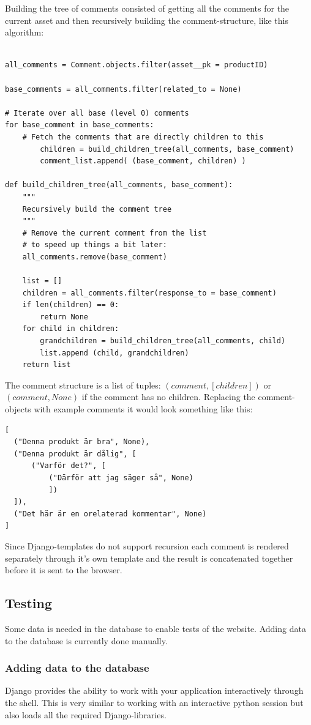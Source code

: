 \documentclass[12pt, a4paper,titlepage]{article}
\begin{document}
Building the tree of comments consisted of getting all the comments for the
current asset and then recursively building the comment-structure, like this
algorithm:
\begin{lstlisting}

all_comments = Comment.objects.filter(asset__pk = productID)

base_comments = all_comments.filter(related_to = None)

# Iterate over all base (level 0) comments
for base_comment in base_comments:
	# Fetch the comments that are directly children to this
    	children = build_children_tree(all_comments, base_comment)
    	comment_list.append( (base_comment, children) )

def build_children_tree(all_comments, base_comment):
	"""
	Recursively build the comment tree
	"""
	# Remove the current comment from the list 
	# to speed up things a bit later:
	all_comments.remove(base_comment) 

	list = []
	children = all_comments.filter(response_to = base_comment)
	if len(children) == 0:
		return None
	for child in children:
		grandchildren = build_children_tree(all_comments, child)
		list.append (child, grandchildren)
	return list
\end{lstlisting}
The comment structure is a list of tuples: $(comment, [children])$ or 
$(comment, None)$ if the comment has no children.
Replacing the comment-objects with example comments it would look 
something like this:
\begin{verbatim}
[
  ("Denna produkt är bra", None),
  ("Denna produkt är dålig", [ 
      ("Varför det?", [
          ("Därför att jag säger så", None)
          ]) 
  ]),
  ("Det här är en orelaterad kommentar", None)
]
\end{verbatim}

Since Django-templates do not support recursion each comment is rendered
separately through it's own template and the result is concatenated together
before it is sent to the browser.

\subsection{Testing}
Some data is needed in the database to enable tests of the website.
Adding data to the database is currently done manually.

\subsubsection{Adding data to the database}
Django provides the ability to work with your application interactively through
the shell. This is very similar to working with an interactive python session but
also loads all the required Django-libraries.
\end{document}
